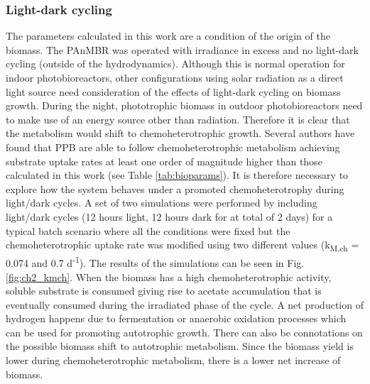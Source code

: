 \subsubsection{Light-dark cycling}
The parameters calculated in this work are a condition of the origin of the biomass. The PAnMBR was operated with irradiance in excess and no light-dark cycling (outside of the hydrodynamics). Although this is normal operation for indoor photobioreactors, other configurations using solar radiation as a direct light source need consideration of the effects of light-dark cycling on biomass growth. During the night, phototrophic biomass in outdoor photobioreactors need to make use of an energy source other than radiation. Therefore it is clear that the metabolism would shift to chemoheterotrophic growth. Several authors have found that PPB are able to follow chemoheterotrophic metabolism achieving substrate uptake rates at least one order of magnitude higher than those calculated in this work (see Table \ref{tab:bioparams}). It is therefore necessary to explore how the system behaves under a promoted chemoheterotrophy during light/dark cycles.
\skippingparagraph
A set of two simulations were performed by including light/dark cycles (12 hours light, 12 hours dark for at total of 2 days) for a typical batch scenario where all the conditions were fixed but the chemoheterotrophic uptake rate was modified using two different values (k\textsubscript{M,ch} = 0.074 and 0.7 d\textsuperscript{-1}). The results of the simulations can be seen in Fig. \ref{fig:ch2_kmch}.  When the biomass has a high chemoheterotrophic activity, soluble substrate is consumed giving rise to acetate accumulation that is eventually consumed during the irradiated phase of the cycle. A net production of hydrogen happens due to fermentation or anaerobic oxidation processes which can be used for promoting autotrophic growth. There can also be connotations on the possible biomass shift to autotrophic metabolism. Since the biomass yield is lower during chemoheterotrophic metabolism, there is a lower net increase of biomass. 

